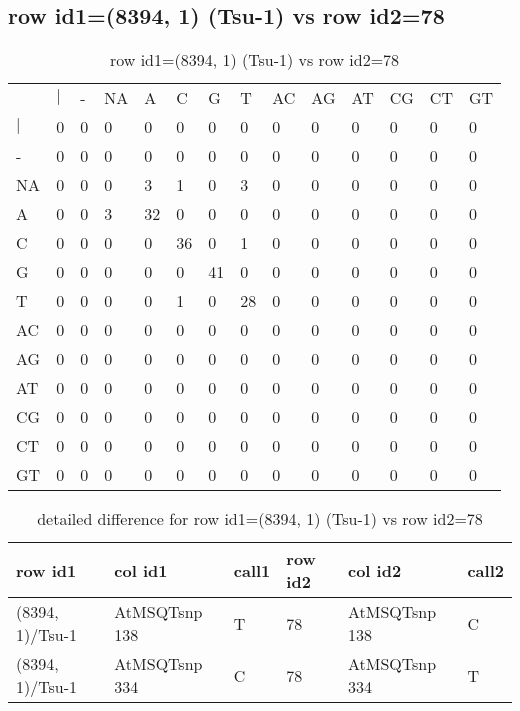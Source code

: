 \subsection{row id1=(8394, 1) (Tsu-1) vs row id2=78}
\begin{center}
\begin{longtable}{|l|l|l|l|l|l|l|l|l|l|l|l|l|l|}
\caption{row id1=(8394, 1) (Tsu-1) vs row id2=78} \label{table_dm448}\\
\hline
\\
\hline
&$|$&-&NA&A&C&G&T&AC&AG&AT&CG&CT&GT\\
$|$&0&0&0&0&0&0&0&0&0&0&0&0&0\\
-&0&0&0&0&0&0&0&0&0&0&0&0&0\\
NA&0&0&0&3&1&0&3&0&0&0&0&0&0\\
A&0&0&3&32&0&0&0&0&0&0&0&0&0\\
C&0&0&0&0&36&0&1&0&0&0&0&0&0\\
G&0&0&0&0&0&41&0&0&0&0&0&0&0\\
T&0&0&0&0&1&0&28&0&0&0&0&0&0\\
AC&0&0&0&0&0&0&0&0&0&0&0&0&0\\
AG&0&0&0&0&0&0&0&0&0&0&0&0&0\\
AT&0&0&0&0&0&0&0&0&0&0&0&0&0\\
CG&0&0&0&0&0&0&0&0&0&0&0&0&0\\
CT&0&0&0&0&0&0&0&0&0&0&0&0&0\\
GT&0&0&0&0&0&0&0&0&0&0&0&0&0\\
\hline
\end{longtable}
\end{center}

\begin{center}
\begin{longtable}{|l|l|l|l|l|l|}
\caption{detailed difference for row id1=(8394, 1) (Tsu-1) vs row id2=78} \label{table_dm449}\\
\hline
row id1&col id1&call1&row id2&col id2&call2\\
\hline
(8394, 1)/Tsu-1&AtMSQTsnp 138&T&78&AtMSQTsnp 138&C\\
(8394, 1)/Tsu-1&AtMSQTsnp 334&C&78&AtMSQTsnp 334&T\\
\hline
\end{longtable}
\end{center}

